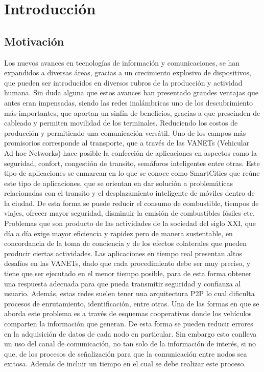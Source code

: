 \chapter{Introducción}

\section{Motivación}
Los nuevos avances en tecnologías de información y comunicaciones, se han expandidos a diversas áreas, gracias a un crecimiento explosivo de dispositivos, que pueden ser introducidos en diversos rubros de la producción y actividad humana. Sin duda alguna que estos avances han presentado grandes ventajas que antes eran impensadas, siendo las redes inalámbricas uno de los descubrimiento más importantes, que aportan un sinfín de beneficios, gracias a que prescinden de cableado y permiten movilidad de los terminales. Reduciendo los costos de producción y permitiendo una comunicación versátil.
Uno de los campos más promisorios corresponde al transporte, que a través de las VANETs (Vehicular Ad-hoc Networks) hace posible la confección de aplicaciones en aspectos como la seguridad, confort, congestión de transito, semáforos inteligentes entre otras. Este tipo de aplicaciones se enmarcan en lo que se conoce como SmartCities que reúne este tipo de aplicaciones, que se orientan en dar solución a problemáticas relacionadas con el transito y el desplazamiento inteligente de móviles dentro de la ciudad. De esta forma se puede reducir el consumo de combustible, tiempos de viajes, ofrecer mayor seguridad, disminuir la emisión de combustibles fósiles etc. Problemas que son producto de las actividades de la sociedad del siglo XXI, que día a día exige mayor eficiencia y rapidez pero de manera sustentable, en concordancia de la toma de conciencia y de los efectos colaterales que pueden producir ciertas actividades.
Las aplicaciones en tiempo real presentan altos desafíos en las VANETs, dado que cada procedimiento debe ser muy preciso, y tiene que ser ejecutado en el menor tiempo posible, para de esta forma obtener una respuesta adecuada para que pueda transmitir seguridad y confianza al usuario. Además, estas redes suelen tener una arquitectura P2P lo cual dificulta procesos de enrutamiento, identificación, entre otras.
Una de las formas en que se aborda este problema es a través de esquemas cooperativos donde los vehículos comparten la información que generan. De esta forma se pueden reducir errores en la adquisición de datos de cada nodo en particular. Sin embargo esto conlleva un uso del canal de comunicación, no tan solo de la información de interés, si no que, de los procesos de señalización para que la comunicación entre nodos sea exitosa. Además de incluir un tiempo en el cual se debe realizar este proceso.
